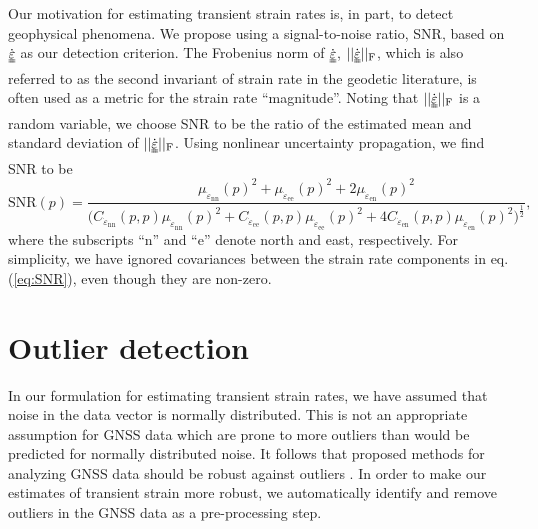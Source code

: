 \documentclass[10pt,letter]{article}
\newcommand*{\du}[1]{\uuline{#1}}
\begin{document}
Our motivation for estimating transient strain rates is, in part, to detect geophysical phenomena. We propose using a signal-to-noise ratio, SNR, based on $\dot{\du{\varepsilon}}$ as our detection criterion. The Frobenius norm of $\dot{\du{\varepsilon}}$, $||\dot{\du{\varepsilon}}||_\mathrm{F}$, which is also referred to as the second invariant of strain rate in the geodetic literature, is often used as a metric for the strain rate ``magnitude''. Noting that $||\dot{\du{\varepsilon}}||_\mathrm{F}$ is a random variable, we choose SNR to be the ratio of the estimated mean and standard deviation of $||\dot{\du{\varepsilon}}||_\mathrm{F}$. Using nonlinear uncertainty propagation, we find SNR to be  
\begin{equation}\label{eq:SNR}
\mathrm{SNR}(p) = \frac{\mu_{\dot{\varepsilon}_\mathrm{nn}}(p)^2 +
                        \mu_{\dot{\varepsilon}_\mathrm{ee}}(p)^2 +
                        2\mu_{\dot{\varepsilon}_\mathrm{en}}(p)^2}
                       {\big(C_{\dot{\varepsilon}_\mathrm{nn}}(p,p)\mu_{\dot{\varepsilon}_\mathrm{nn}}(p)^2 + 
                              C_{\dot{\varepsilon}_\mathrm{ee}}(p,p)\mu_{\dot{\varepsilon}_\mathrm{ee}}(p)^2 + 
                              4C_{\dot{\varepsilon}_\mathrm{en}}(p,p)\mu_{\dot{\varepsilon}_\mathrm{en}}(p)^2
                        \big)^{\frac{1}{2}}}
,
\end{equation}
where the subscripts ``n'' and ``e'' denote north and east, respectively. For simplicity, we have ignored covariances between the strain rate components in eq. (\ref{eq:SNR}), even though they are non-zero.  

\section{Outlier detection}\label{sec:Outlier}
In our formulation for estimating transient strain rates, we have assumed that noise in the data vector is normally distributed. This is not an appropriate assumption for GNSS data which are prone to more outliers than would be predicted for normally distributed noise. It follows that proposed methods for analyzing GNSS data should be robust against outliers \citep[e.g.,][]{Blewitt2016}. In order to make our estimates of transient strain more robust, we automatically identify and remove outliers in the GNSS data as a pre-processing step.
\end{document}
